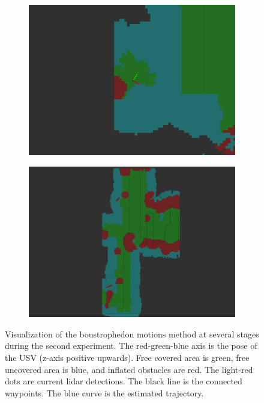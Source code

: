 \begin{figure}[h!]
{\begin{subfigure}[b]{0.5\textwidth}
		\includegraphics[height=0.25\textheight,width=1\textwidth]{fig/results/ex2_alg11}
		\caption{}
	\end{subfigure}
	\begin{subfigure}[b]{0.5\textwidth}
		\centering
		\includegraphics[height=0.25\textheight,width=1\textwidth]{fig/results/ex2_alg_2}
		\caption{}
	\end{subfigure}
	}
\caption[Visualization of the boustrophedon motions method at several stages during the second experiment]{Visualization of the boustrophedon motions method at several stages during the second experiment. The red-green-blue axis is the pose of the USV (z-axis positive upwards). Free covered area is green, free uncovered area is blue, and inflated obstacles are red. The light-red dots are current lidar detections. The black line is the connected waypoints. The blue curve is the estimated trajectory.}
	\label{fig:ex2_res}
\end{figure}

